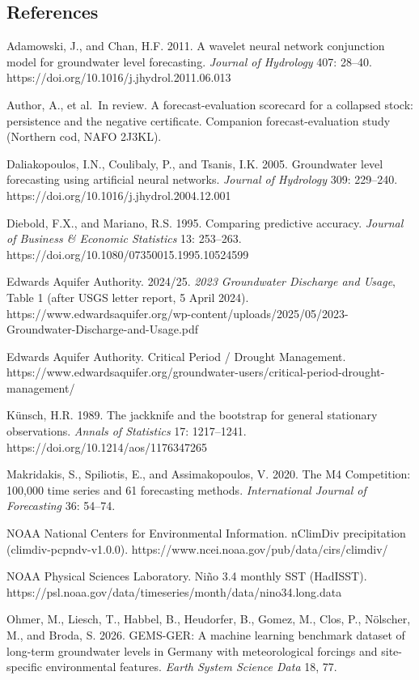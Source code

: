 \documentclass[11pt]{article}
\begin{document}
\subsection{References}\label{references}

Adamowski, J., and Chan, H.F. 2011. A wavelet neural network conjunction
model for groundwater level forecasting. \emph{Journal of Hydrology}
407: 28--40. https://doi.org/10.1016/j.jhydrol.2011.06.013

Author, A., et al.~In review. A forecast-evaluation scorecard for a
collapsed stock: persistence and the negative certificate. Companion
forecast-evaluation study (Northern cod, NAFO 2J3KL).

Daliakopoulos, I.N., Coulibaly, P., and Tsanis, I.K. 2005. Groundwater
level forecasting using artificial neural networks. \emph{Journal of
Hydrology} 309: 229--240. https://doi.org/10.1016/j.jhydrol.2004.12.001

Diebold, F.X., and Mariano, R.S. 1995. Comparing predictive accuracy.
\emph{Journal of Business \& Economic Statistics} 13: 253--263.
https://doi.org/10.1080/07350015.1995.10524599

Edwards Aquifer Authority. 2024/25. \emph{2023 Groundwater Discharge and
Usage}, Table 1 (after USGS letter report, 5 April 2024).
https://www.edwardsaquifer.org/wp-content/uploads/2025/05/2023-Groundwater-Discharge-and-Usage.pdf

Edwards Aquifer Authority. Critical Period / Drought Management.
https://www.edwardsaquifer.org/groundwater-users/critical-period-drought-management/

K\"unsch, H.R. 1989. The jackknife and the bootstrap for general
stationary observations. \emph{Annals of Statistics} 17: 1217--1241.
https://doi.org/10.1214/aos/1176347265

Makridakis, S., Spiliotis, E., and Assimakopoulos, V. 2020. The M4
Competition: 100,000 time series and 61 forecasting methods.
\emph{International Journal of Forecasting} 36: 54--74.

NOAA National Centers for Environmental Information. nClimDiv
precipitation (climdiv-pcpndv-v1.0.0).
https://www.ncei.noaa.gov/pub/data/cirs/climdiv/

NOAA Physical Sciences Laboratory. Ni\~no 3.4 monthly SST (HadISST).
https://psl.noaa.gov/data/timeseries/month/data/nino34.long.data

Ohmer, M., Liesch, T., Habbel, B., Heudorfer, B., Gomez, M., Clos, P.,
N\"olscher, M., and Broda, S. 2026. GEMS-GER: A machine learning benchmark
dataset of long-term groundwater levels in Germany with meteorological
forcings and site-specific environmental features. \emph{Earth System
Science Data} 18, 77.
\end{document}

